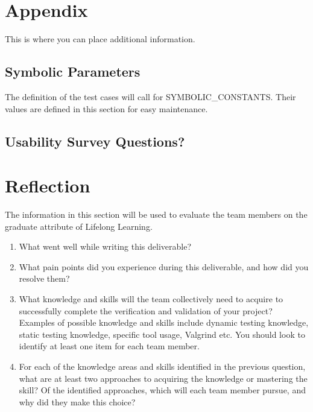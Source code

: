 \documentclass[12pt, titlepage]{article}
\begin{document}
\begin{appendices}

\section{Appendix}

This is where you can place additional information.

\subsection{Symbolic Parameters}

The definition of the test cases will call for SYMBOLIC\_CONSTANTS.
Their values are defined in this section for easy maintenance.

\subsection{Usability Survey Questions?}


\newpage{}
\section{Reflection}


The information in this section will be used to evaluate the team members on the
graduate attribute of Lifelong Learning.



\begin{enumerate}
  \item What went well while writing this deliverable? 
  \item What pain points did you experience during this deliverable, and how
    did you resolve them?
  \item What knowledge and skills will the team collectively need to acquire to
  successfully complete the verification and validation of your project?
  Examples of possible knowledge and skills include dynamic testing knowledge,
  static testing knowledge, specific tool usage, Valgrind etc.  You should look to
  identify at least one item for each team member.
  \item For each of the knowledge areas and skills identified in the previous
  question, what are at least two approaches to acquiring the knowledge or
  mastering the skill?  Of the identified approaches, which will each team
  member pursue, and why did they make this choice?
\end{enumerate}


\end{appendices}
\end{document}
